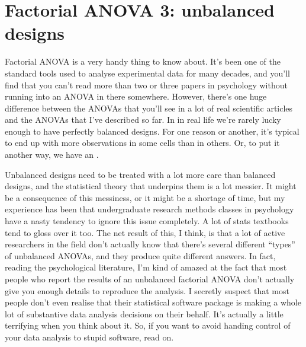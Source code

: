 \section{Factorial ANOVA 3: unbalanced designs\label{sec:unbalancedanova}}

Factorial ANOVA is a very handy thing to know about. It's been one of the standard tools used to analyse experimental data for many decades, and you'll find that you can't read more than two or three papers in psychology without running into an ANOVA in there somewhere. However, there's one huge difference between the ANOVAs that you'll see in a lot of real scientific articles and the ANOVAs that I've described so far. In in real life we're rarely lucky enough to have perfectly balanced designs. For one reason or another, it's typical to end up with more observations in some cells than in others. Or, to put it another way, we have an .

Unbalanced designs need to be treated with a lot more care than balanced designs, and the statistical theory that underpins them is a lot messier. It might be a consequence of this messiness, or it might be a shortage of time, but my experience has been that undergraduate research methods classes in psychology have a nasty tendency to ignore this issue completely. A lot of stats textbooks tend to gloss over it too. The net result of this, I think, is that a lot of active researchers in the field don't actually know that there's several different ``types'' of unbalanced ANOVAs, and they produce quite different answers. In fact, reading the psychological literature, I'm kind of amazed at the fact that most people who report the results of an unbalanced factorial ANOVA don't actually give you enough details to reproduce the analysis. I secretly suspect that most people don't even realise that their statistical software package is making a whole lot of substantive data analysis decisions on their behalf. It's actually a little terrifying when you think about it. So, if you want to avoid handing control of your data analysis to stupid software, read on.


